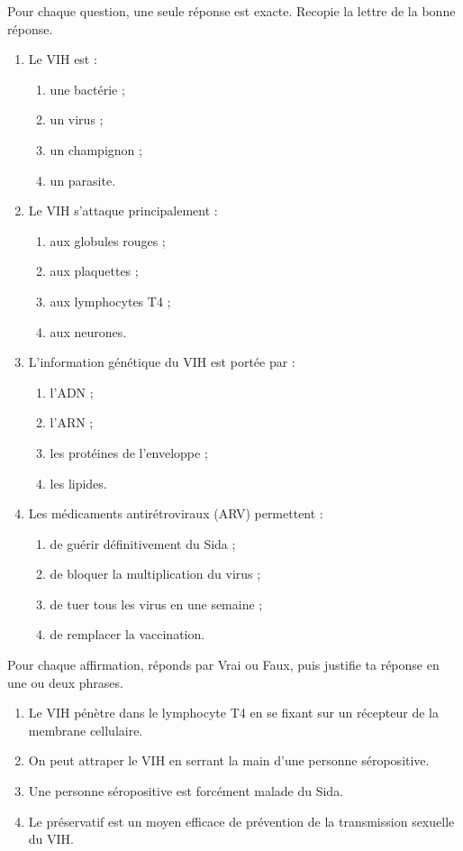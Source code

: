 \documentclass[11pt]{article}
\begin{document}
\begin{exercice}
Pour chaque question, une seule réponse est exacte. Recopie la lettre de la bonne réponse.
\begin{enumerate}
\item Le VIH est :
\begin{enumerate}
\item une bactérie ;
\item un virus ;
\item un champignon ;
\item un parasite.
\end{enumerate}
\item Le VIH s'attaque principalement :
\begin{enumerate}
\item aux globules rouges ;
\item aux plaquettes ;
\item aux lymphocytes T4 ;
\item aux neurones.
\end{enumerate}
\item L'information génétique du VIH est portée par :
\begin{enumerate}
\item l'ADN ;
\item l'ARN ;
\item les protéines de l'enveloppe ;
\item les lipides.
\end{enumerate}
\item Les médicaments antirétroviraux (ARV) permettent :
\begin{enumerate}
\item de guérir définitivement du Sida ;
\item de bloquer la multiplication du virus ;
\item de tuer tous les virus en une semaine ;
\item de remplacer la vaccination.
\end{enumerate}
\end{enumerate}
\end{exercice}

\begin{exercice}
Pour chaque affirmation, réponds par Vrai ou Faux, puis justifie ta réponse en une ou deux phrases.
\begin{enumerate}
\item Le VIH pénètre dans le lymphocyte T4 en se fixant sur un récepteur de la membrane cellulaire.
\item On peut attraper le VIH en serrant la main d'une personne séropositive.
\item Une personne séropositive est forcément malade du Sida.
\item Le préservatif est un moyen efficace de prévention de la transmission sexuelle du VIH.
\end{enumerate}
\end{exercice}
\end{document}

